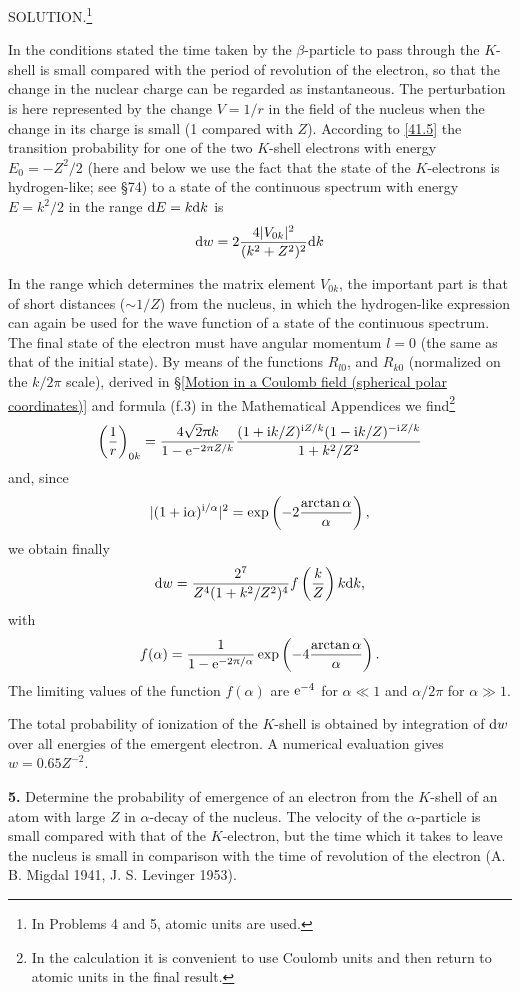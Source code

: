 {SOLUTION.\footnote{In Problems 4 and 5, atomic units are used.}


In the conditions stated the time taken by the $\beta$-particle to pass through the $ K $-shell is small compared with the period of revolution of the electron, so that the change in the nuclear charge can be regarded as instantaneous. The perturbation is here represented by the change $ V = 1/r $ in the field of the nucleus when the change in its charge is small (1 compared with $ Z $). According to \eqref{41.5} the transition probability for one of the two $ K $-shell electrons with energy $ E_0=-Z^2/2 $ (here and below we use the fact that the state of the $ K $-electrons is hydrogen-like; see \S74) to a state of the continuous spectrum with energy $ E=k^2/2 $ in the range $\mathrm{d} E = k \mathrm{d} k $ is
\[ \mathrm{d} w=2\frac{4|V_{0k}|^2}{(k^2+Z^2)^2}\mathrm{d} k \]



In the range which determines the matrix element $ V_{0k} $, the important part is that of short distances ($ \sim1/Z $) from the nucleus, in which the hydrogen-like expression can again be used for the wave function of a state of the continuous spectrum. The final state of the electron must have angular momentum $ l = 0 $ (the same as that of the initial state). By means of the functions $ R_{l0} $, and $ R_{k0} $ (normalized on the $ k/2\pi $ scale), derived in \S\ref{Motion in a Coulomb field (spherical polar coordinates)} and formula (f.3) in the Mathematical Appendices we find\footnote{In the calculation it is convenient to use Coulomb units and then return to atomic units in the final result.}
\[ \left(\frac{1}{r} \right)_{0k}=\frac{4\sqrt2\uppi k}{1-\mathrm{e}^{-2\uppi Z/k}}\frac{(1+\mathrm{i} k/Z)^{\mathrm{i} Z/k}(1-\mathrm{i} k/Z)^{-\mathrm{i} Z/k}}{1+k^2/Z^2} \]
and, since
\[ |(1+\mathrm{i}\alpha)^{\mathrm{i}/\alpha}|^2=\exp\left(-2\frac{\arctan\alpha}{\alpha} \right), \]
we obtain finally
\[ \mathrm{d} w=\frac{2^7}{Z^4(1+k^2/Z^2)^4}f\left(\frac{k}{Z}\right)k\mathrm{d} k, \]
with
\[ f(\alpha)=\frac{1}{1-\mathrm{e}^{-2\uppi/\alpha}}\exp\left(-4\frac{\arctan\alpha}{\alpha} \right). \]
The limiting values of the function $ f (\alpha) $ are $ \mathrm{e}^{-4} $ for $ \alpha\ll 1 $ and $ \alpha/2\pi $ for $ \alpha\gg 1 $.

The total probability of ionization of the $ K $-shell is obtained by integration of $ \mathrm{d} w $ over all energies of the emergent electron. A numerical evaluation gives $ w = 0.65Z^{-2} $.





\textbf{5.} Determine the probability of emergence of an electron from the $ K $-shell of an atom with large $ Z $ in $\alpha$-decay of the nucleus. The velocity of the $\alpha$-particle is small compared with that of the $ K $-electron, but the time which it takes to leave the nucleus is small in comparison with the time of revolution of the electron (A. B. Migdal 1941, J. S. Levinger 1953).





}
